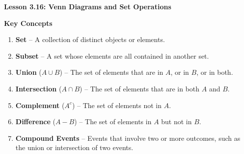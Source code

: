 \begin{center}
\textbf{Lesson 3.16: Venn Diagrams and Set Operations}
\end{center}

\vspace*{-1.5ex}

\noindent\textbf{Key Concepts}

\begin{enumerate}[label=\color{blue}\arabic*.]
    \item \textbf{Set} – A collection of distinct objects or elements.
    \item \textbf{Subset} – A set whose elements are all contained in another set.
    \item \textbf{Union} (\(A \cup B\)) – The set of elements that are in \(A\), or in \(B\), or in both.
    \item \textbf{Intersection} (\(A \cap B\)) – The set of elements that are in both \(A\) and \(B\).
    \item \textbf{Complement} (\(A^c\)) – The set of elements not in \(A\).
    \item \textbf{Difference} (\(A - B\)) – The set of elements in \(A\) but not in \(B\).
    \item \textbf{Compound Events} – Events that involve two or more outcomes, such as the union or intersection of two events.
\end{enumerate}


